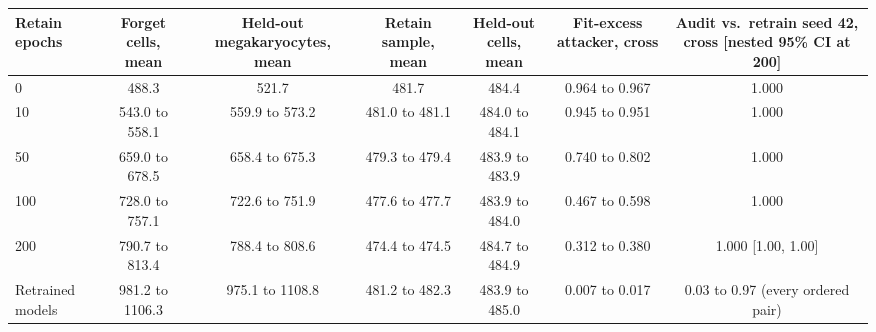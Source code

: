 \begin{tabular}{lcccccc}
\toprule
Retain epochs & Forget cells, mean & Held-out megakaryocytes, mean & Retain sample, mean & Held-out cells, mean & Fit-excess attacker, cross & Audit vs.\ retrain seed 42, cross [nested 95\% CI at 200] \\
\midrule
0 & 488.3 & 521.7 & 481.7 & 484.4 & 0.964 to 0.967 & 1.000 \\
10 & 543.0 to 558.1 & 559.9 to 573.2 & 481.0 to 481.1 & 484.0 to 484.1 & 0.945 to 0.951 & 1.000 \\
50 & 659.0 to 678.5 & 658.4 to 675.3 & 479.3 to 479.4 & 483.9 to 483.9 & 0.740 to 0.802 & 1.000 \\
100 & 728.0 to 757.1 & 722.6 to 751.9 & 477.6 to 477.7 & 483.9 to 484.0 & 0.467 to 0.598 & 1.000 \\
200 & 790.7 to 813.4 & 788.4 to 808.6 & 474.4 to 474.5 & 484.7 to 484.9 & 0.312 to 0.380 & 1.000 [1.00, 1.00] \\
\midrule
Retrained models & 981.2 to 1106.3 & 975.1 to 1108.8 & 481.2 to 482.3 & 483.9 to 485.0 & 0.007 to 0.017 & 0.03 to 0.97 (every ordered pair) \\
\bottomrule
\end{tabular}
